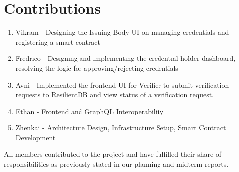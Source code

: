 \section{Contributions}

\begin{enumerate}
    \item Vikram - Designing the Issuing Body UI on managing credentials and registering a smart contract
    \item Fredrico - Designing and implementing the credential holder dashboard, resolving the logic for approving/rejecting credentials
    \item Avni - Implemented the frontend UI for Verifier to submit verification requests to ResilientDB and view status of a verification request. 
    \item Ethan - Frontend and GraphQL Interoperability
    \item Zhenkai - Architecture Design, Infrastructure Setup, Smart Contract Development
\end{enumerate}

All members contributed to the project and have fulfilled their share of responsibilities as
previously stated in our planning and midterm reports.
